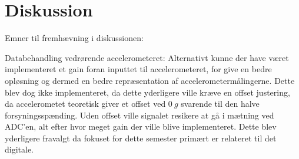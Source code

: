 \section{Diskussion}
Emner til fremhævning i diskussionen:


Databehandling vedrørende accelerometeret:
Alternativt kunne der have været implementeret et gain foran inputtet til accelerometeret, for give en bedre opløsning og dermed en bedre repræsentation af accelerometermålingerne. Dette blev dog ikke implementeret, da dette yderligere ville kræve en offset justering, da accelerometet teoretisk giver et offset ved $0~g$ svarende til den halve forsyningsspænding. Uden offset ville signalet resikere at gå i mætning ved ADC'en, alt efter hvor meget gain der ville blive implementeret. Dette blev yderligere fravalgt da fokuset for dette semester primært er relateret til det digitale.   